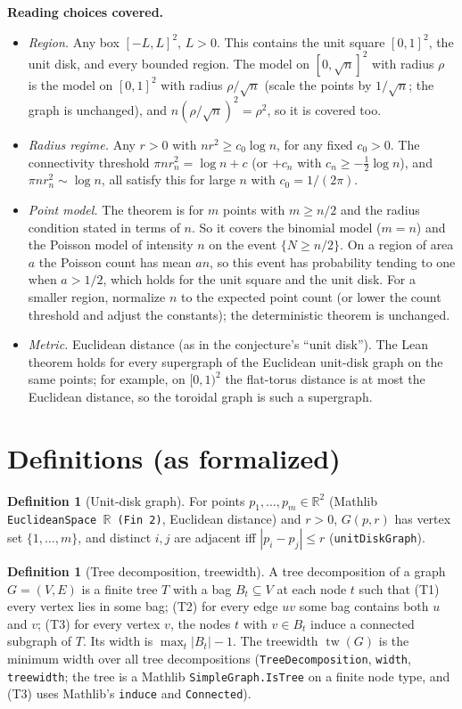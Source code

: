 \documentclass[11pt]{article}
\theoremstyle{definition}
\newtheorem{definition}[theorem]{Definition}
\theoremstyle{remark}
\newcommand{\tw}{\operatorname{tw}}
\begin{document}
\textbf{Reading choices covered.}
\begin{itemize}
\item \emph{Region.} Any box $[-L,L]^2$, $L>0$. This contains the unit square $[0,1]^2$, the
  unit disk, and every bounded region. The model on $[0,\sqrt n]^2$ with radius $\rho$ is the
  model on $[0,1]^2$ with radius $\rho/\sqrt n$ (scale the points by $1/\sqrt n$; the graph is
  unchanged), and $n(\rho/\sqrt n)^2=\rho^2$, so it is covered too.
\item \emph{Radius regime.} Any $r>0$ with $n r^2\ge c_0\log n$, for any fixed $c_0>0$. The
  connectivity threshold $\pi n r_n^2=\log n + c$ (or $+c_n$ with $c_n\ge -\tfrac12\log n$), and
  $\pi n r_n^2\sim\log n$, all satisfy this for large $n$ with $c_0=1/(2\pi)$.
\item \emph{Point model.} The theorem is for $m$ points with $m\ge n/2$ and the radius condition
  stated in terms of $n$. So it covers the binomial model ($m=n$) and the Poisson model of
  intensity $n$ on the event $\{N\ge n/2\}$. On a region of area $a$ the Poisson count has mean
  $an$, so this event has probability tending to one when $a>1/2$, which holds for the unit
  square and the unit disk. For a smaller region, normalize $n$ to the expected point count
  (or lower the count threshold and adjust the constants); the deterministic theorem is unchanged.
\item \emph{Metric.} Euclidean distance (as in the conjecture's ``unit disk''). The Lean theorem
  holds for every supergraph of the Euclidean unit-disk graph on the same points; for example,
  on $[0,1)^2$ the flat-torus distance is at most the Euclidean distance, so the toroidal graph
  is such a supergraph.
\end{itemize}

\section{Definitions (as formalized)}

\begin{definition}[Unit-disk graph]
For points $p_1,\dots,p_m\in\mathbb{R}^2$ (Mathlib \texttt{EuclideanSpace $\mathbb{R}$ (Fin 2)},
Euclidean distance) and $r>0$, $G(p,r)$ has vertex set $\{1,\dots,m\}$, and distinct $i,j$ are
adjacent iff $|p_i-p_j|\le r$ (\texttt{unitDiskGraph}).
\end{definition}

\begin{definition}[Tree decomposition, treewidth]
A tree decomposition of a graph $G=(V,E)$ is a finite tree $T$ with a bag $B_t\subseteq V$ at
each node $t$ such that (T1) every vertex lies in some bag; (T2) for every edge $uv$ some bag
contains both $u$ and $v$; (T3) for every vertex $v$, the nodes $t$ with $v\in B_t$ induce a
connected subgraph of $T$. Its width is $\max_t |B_t|-1$. The treewidth $\tw(G)$ is the minimum
width over all tree decompositions (\texttt{TreeDecomposition}, \texttt{width},
\texttt{treewidth}; the tree is a Mathlib \texttt{SimpleGraph.IsTree} on a finite node type, and
(T3) uses Mathlib's \texttt{induce} and \texttt{Connected}).
\end{definition}
\end{document}
